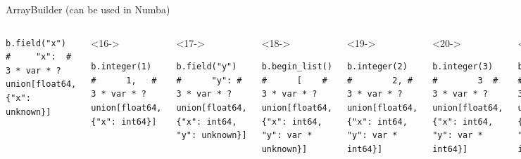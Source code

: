 \documentclass[aspectratio=169]{beamer}
\begin{document}
\begin{frame}[fragile]{ArrayBuilder (can be used in Numba)}
\begin{columns}
\begin{uncoverenv}
\begin{verbatim}
b.field("x")      #     "x":  # 3 * var * ?union[float64, {"x": unknown}]
\end{verbatim}
\end{uncoverenv}
\vspace{-0.43 cm}
\begin{uncoverenv}<16->
\begin{verbatim}
b.integer(1)      #      1,   # 3 * var * ?union[float64, {"x": int64}]
\end{verbatim}
\end{uncoverenv}
\vspace{-0.43 cm}
\begin{uncoverenv}<17->
\begin{verbatim}
b.field("y")      #      "y": # 3 * var * ?union[float64, {"x": int64, "y": unknown}]
\end{verbatim}
\end{uncoverenv}
\vspace{-0.43 cm}
\begin{uncoverenv}<18->
\begin{verbatim}
b.begin_list()    #      [    # 3 * var * ?union[float64, {"x": int64, "y": var * unknown}]
\end{verbatim}
\end{uncoverenv}
\vspace{-0.43 cm}
\begin{uncoverenv}<19->
\begin{verbatim}
b.integer(2)      #        2, # 3 * var * ?union[float64, {"x": int64, "y": var * int64}]
\end{verbatim}
\end{uncoverenv}
\vspace{-0.43 cm}
\begin{uncoverenv}<20->
\begin{verbatim}
b.integer(3)      #        3  # 3 * var * ?union[float64, {"x": int64, "y": var * int64}]
\end{verbatim}
\end{uncoverenv}
\vspace{-0.43 cm}
\begin{uncoverenv}<21->
\begin{verbatim}
b.end_list()      #      ]    # 3 * var * ?union[float64, {"x": int64, "y": var * int64}]
\end{verbatim}
\end{uncoverenv}
\vspace{-0.43 cm}
\begin{uncoverenv}<22->
\begin{verbatim}

\end{verbatim}
\end{uncoverenv}
\end{columns}
\end{frame}
\end{document}
